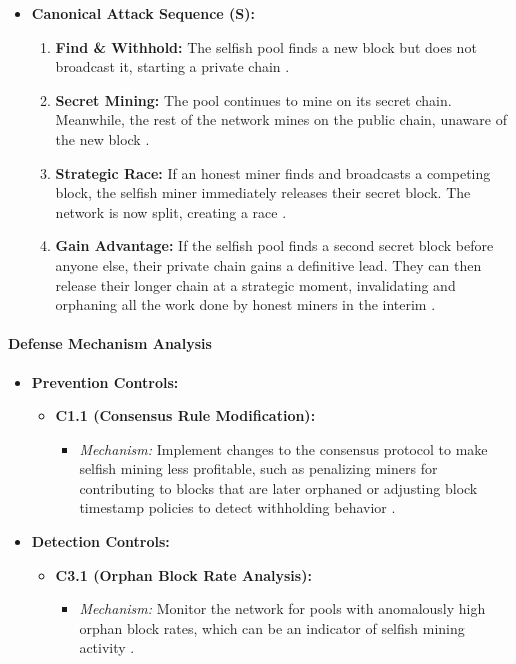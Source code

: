 \begin{itemize}
    \item \textbf{Canonical Attack Sequence (S):}
    \begin{enumerate}
        \item \textbf{Find \& Withhold:} The selfish pool finds a new block but does not broadcast it, starting a private chain \cite{Eyal2014}.
        \item \textbf{Secret Mining:} The pool continues to mine on its secret chain. Meanwhile, the rest of the network mines on the public chain, unaware of the new block \cite{Eyal2014}.
        \item \textbf{Strategic Race:} If an honest miner finds and broadcasts a competing block, the selfish miner immediately releases their secret block. The network is now split, creating a race \cite{Eyal2014, Wang2019}.
        \item \textbf{Gain Advantage:} If the selfish pool finds a second secret block before anyone else, their private chain gains a definitive lead. They can then release their longer chain at a strategic moment, invalidating and orphaning all the work done by honest miners in the interim \cite{Eyal2014}.
    \end{enumerate}
\end{itemize}

\paragraph{Defense Mechanism Analysis}

\begin{itemize}
    \item \textbf{Prevention Controls:}
    \begin{itemize}
        \item \textbf{C1.1 (Consensus Rule Modification):}
            \begin{itemize}
                \item \textit{Mechanism:} Implement changes to the consensus protocol to make selfish mining less profitable, such as penalizing miners for contributing to blocks that are later orphaned or adjusting block timestamp policies to detect withholding behavior \cite{Eyal2014, Wang2019}.
            \end{itemize}
    \end{itemize}
    \item \textbf{Detection Controls:}
    \begin{itemize}
        \item \textbf{C3.1 (Orphan Block Rate Analysis):}
            \begin{itemize}
                \item \textit{Mechanism:} Monitor the network for pools with anomalously high orphan block rates, which can be an indicator of selfish mining activity \cite{Wang2019}.
            \end{itemize}
    \end{itemize}
\end{itemize}

